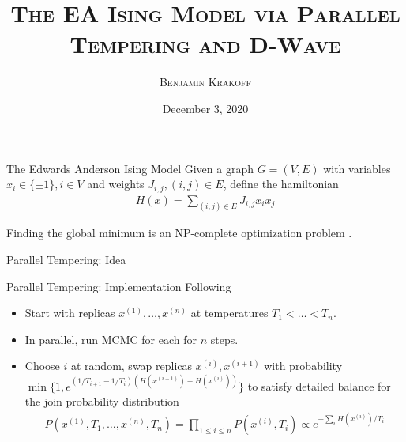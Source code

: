 \documentclass{beamer}
\title{\scshape{The EA Ising Model via Parallel Tempering and D-Wave}}
\author{\scshape{Benjamin Krakoff}}
\date{December 3, 2020}
\begin{document}
	\begin{frame}
		\titlepage
	\end{frame}

\begin{frame}{The Edwards Anderson Ising Model}
	Given a graph $G = (V, E)$ with variables $x_i \in \{\pm1\}, i \in V$ and weights $J_{i, j}, (i, j) \in E$, define the hamiltonian
	\begin{align*}
		H(x) = \sum_{(i, j) \in E} J_{i, j} x_ix_j
	\end{align*}

\vspace{30mm}
Finding the global minimum is  an NP-complete optimization problem \cite{1982JPhA...15.3241B}.
	\end{frame}

\begin{frame}{Parallel Tempering: Idea}
	
	\end{frame}

\begin{frame}{Parallel Tempering: Implementation}
	Following \cite{B509983H}
	\begin{itemize}
	\item Start with replicas $x^{(1)}, \ldots, x^{(n)}$ at temperatures $T_1 < \ldots  < T_n$. 
	\item In parallel, run MCMC for each for $n$ steps. 
	\item Choose $i$ at random, swap replicas $x^{(i)}, x^{(i+1)}$ with probability  $\min\{1, e^{(1/T_{i+1}-1/{T_i})(H(x^{(i+1)}) - H(x^{(i)}))}\}$ to satisfy detailed balance for the join probability distribution
	\begin{align*}
		P(x^{(1)}, T_1, \ldots, x^{(n)}, T_n) = \prod_{1\leq i \leq n} P(x^{(i)}, T_i) \propto e^{-\sum_i H(x^{(i)})/T_i}
		\end{align*}
	\end{itemize}
	\end{frame}
\end{document}
